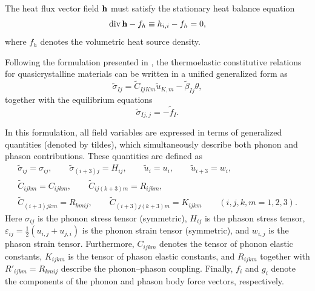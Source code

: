 The heat flux vector field ${\bf h}$ must satisfy the stationary heat
balance equation
\begin{equation}
	\mathrm{div}\,{\bf h} - f_h \equiv h_{i,i} - f_h = 0,
	\label{KushnirEq2}
\end{equation}
where $f_h$ denotes the volumetric heat source density.

Following the formulation presented in \cite{Kushnir34}, the
thermoelastic constitutive relations for quasicrystalline materials
can be written in a unified generalized form as
\begin{equation}
	\tilde{\sigma}_{Ij}
	=
	\tilde{C}_{IjKm}\tilde{u}_{K,m}
	-
	\tilde{\beta}_{Ij}\theta,
	\label{KushnirEq3}
\end{equation}
together with the equilibrium equations
\begin{equation}
	\tilde{\sigma}_{Ij,j}=-\tilde{f}_{I}.
	\label{KushnirEq4}
\end{equation}

In this formulation, all field variables are expressed in terms of
generalized quantities (denoted by tildes), which simultaneously
describe both phonon and phason contributions. These quantities are
defined as
\begin{equation}
	\begin{array}{l}
		\tilde{\sigma}_{ij}=\sigma_{ij}, \qquad
		\tilde{\sigma}_{(i+3)j}=H_{ij}, \qquad
		\tilde{u}_{i}=u_{i}, \qquad
		\tilde{u}_{i+3}=w_{i}, \\[3pt]
		\tilde{C}_{ijkm}=C_{ijkm}, \qquad
		\tilde{C}_{ij(k+3)m}=R_{ijkm}, \\[3pt]
		\tilde{C}_{(i+3)jkm}=R_{kmij}, \qquad
		\tilde{C}_{(i+3)j(k+3)m}=K_{ijkm} \qquad
		(i,j,k,m=1,2,3).
	\end{array}
	\label{KushnirEq5}
\end{equation}
%
Here $\sigma_{ij}$ is the phonon stress tensor (symmetric),
$H_{ij}$ is the phason stress tensor,
$\varepsilon_{ij}=\tfrac12(u_{i,j}+u_{j,i})$ is the phonon strain tensor
(symmetric), and $w_{i,j}$ is the phason strain tensor.
Furthermore, $C_{ijkm}$ denotes the tensor of phonon elastic constants,
$K_{ijkm}$ is the tensor of phason elastic constants, and
$R_{ijkm}$ together with $R'_{ijkm}=R_{kmij}$ describe the
phonon–phason coupling. Finally, $f_i$ and $g_i$ denote the components
of the phonon and phason body force vectors, respectively.

